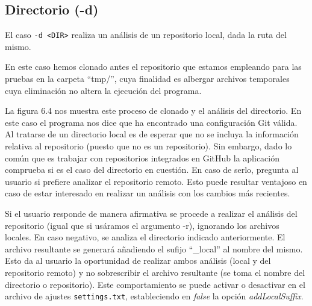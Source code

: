 \documentclass[a4paper, 12pt]{book}
\begin{document}
\subsection{Directorio (-d)}

El caso \texttt{-d <DIR>} realiza un análisis de un repositorio local, dada la ruta del mismo. 

En este caso hemos clonado antes el repositorio que estamos empleando para las pruebas en la carpeta ``tmp/'', cuya finalidad es albergar archivos temporales cuya eliminación no altera la ejecución del programa.

La figura 6.4 nos muestra este proceso de clonado y el análisis del directorio. En este caso el programa nos dice que ha encontrado una configuración Git válida. Al tratarse de un directorio local es de esperar que no se incluya la información relativa al repositorio (puesto que no es un repositorio). Sin embargo, dado lo común que es trabajar con repositorios integrados en GitHub la aplicación comprueba si es el caso del directorio en cuestión. En caso de serlo, pregunta al usuario si prefiere analizar el repositorio remoto. Esto puede resultar ventajoso en caso de estar interesado en realizar un análisis con los cambios más recientes. 

Si el usuario responde de manera afirmativa se procede a realizar el análisis del repositorio (igual que si usáramos el argumento -r), ignorando los archivos locales. En caso negativo, se analiza el directorio indicado anteriormente. El archivo resultante se generará añadiendo el sufijo ``\_local'' al nombre del mismo. Esto da al usuario la oportunidad de realizar ambos análisis (local y del repositorio remoto) y no sobrescribir el archivo resultante (se toma el nombre del directorio o repositorio). Este comportamiento se puede activar o desactivar en el archivo de ajustes \texttt{settings.txt}, estableciendo en \textit{false} la opción \textit{addLocalSuffix}.
\end{document}
